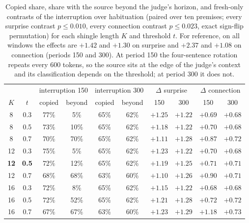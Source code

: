 \documentclass[11pt]{article}
\begin{document}
\begin{table}[h]
\centering\small
\begin{tabular}{@{}cccccccccc@{}}
\toprule
 & & \multicolumn{2}{c}{interruption 150} & \multicolumn{2}{c}{interruption 300} & \multicolumn{2}{c}{$\Delta$ surprise} & \multicolumn{2}{c}{$\Delta$ connection} \\
\cmidrule(lr){3-4}\cmidrule(lr){5-6}\cmidrule(lr){7-8}\cmidrule(lr){9-10}
$K$ & $t$ & copied & beyond & copied & beyond & 150 & 300 & 150 & 300 \\
\midrule
8 & 0.3 & 77\% & 5\% & 65\% & 62\% & $+1.25$ & $+1.22$ & $+0.69$ & $+0.68$ \\
8 & 0.5 & 73\% & 10\% & 65\% & 62\% & $+1.18$ & $+1.22$ & $+0.70$ & $+0.68$ \\
8 & 0.7 & 70\% & 70\% & 65\% & 62\% & $+1.11$ & $+1.28$ & $+0.87$ & $+0.72$ \\
12 & 0.3 & 75\% & 5\% & 65\% & 62\% & $+1.23$ & $+1.22$ & $+0.70$ & $+0.68$ \\
\textbf{12} & \textbf{0.5} & 72\% & 12\% & 65\% & 62\% & $+1.19$ & $+1.25$ & $+0.71$ & $+0.71$ \\
12 & 0.7 & 68\% & 68\% & 63\% & 60\% & $+1.10$ & $+1.26$ & $+0.90$ & $+0.71$ \\
16 & 0.3 & 72\% & 8\% & 65\% & 62\% & $+1.15$ & $+1.22$ & $+0.68$ & $+0.68$ \\
16 & 0.5 & 72\% & 52\% & 65\% & 62\% & $+1.21$ & $+1.28$ & $+0.72$ & $+0.72$ \\
16 & 0.7 & 67\% & 67\% & 63\% & 60\% & $+1.23$ & $+1.29$ & $+1.18$ & $+0.73$ \\
\bottomrule
\end{tabular}
\caption{Copied share, share with the source beyond the judge's horizon, and
fresh-only contrasts of the interruption over habituation (paired over ten
premises; every surprise contrast $p\le0.010$, every connection contrast
$p\le0.023$, exact sign-flip permutation) for each shingle length $K$ and
threshold $t$. For reference, on all windows the effects are $+1.42$ and
$+1.30$ on surprise and $+2.37$ and $+1.08$ on connection (periods 150 and
300). At period 150 the four-sentence rotation repeats every 600 tokens, so
the source sits at the edge of the judge's context and its classification
depends on the threshold; at period 300 it does not.}
\label{tab:sens}
\end{table}
\end{document}
